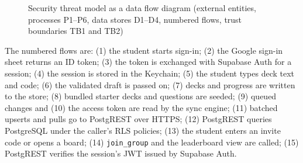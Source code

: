 \documentclass[12pt,letterpaper]{article}
\begin{document}
\begin{figure}[!htbp]
{}
\caption{Security threat model as a data flow diagram (external entities, processes P1--P6, data stores D1--D4, numbered flows, trust boundaries TB1 and TB2)}
\label{fig:dfd}
\end{figure}

The numbered flows are: (1) the student starts sign-in; (2) the Google sign-in sheet
returns an ID token; (3) the token is exchanged with Supabase Auth for a session; (4)
the session is stored in the Keychain; (5) the student types deck text and code; (6)
the validated draft is passed on; (7) decks and progress are written to the store; (8)
bundled starter decks and questions are seeded; (9) queued changes and (10) the access
token are read by the sync engine; (11) batched upserts and pulls go to PostgREST over
HTTPS; (12) PostgREST queries PostgreSQL under the caller's RLS policies; (13) the
student enters an invite code or opens a board; (14) \texttt{join\_group} and the
leaderboard view are called; (15) PostgREST verifies the session's JWT issued by
Supabase Auth.
\end{document}
